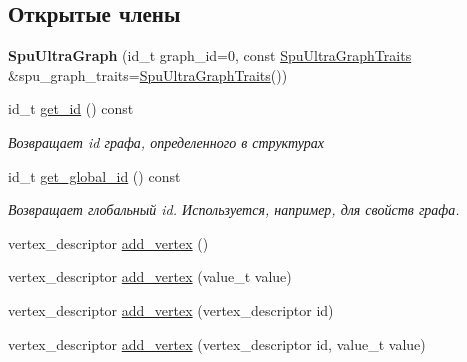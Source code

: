 \subsection*{Открытые члены}
\begin{DoxyCompactItemize}
\item 
\mbox{\label{class_s_p_u___g_r_a_p_h_1_1_spu_ultra_graph_a5092cab48140d2f7ce989555c118e783}} 
{\bfseries Spu\+Ultra\+Graph} (id\+\_\+t graph\+\_\+id=0, const \hyperlink{struct_s_p_u___g_r_a_p_h_1_1_spu_ultra_graph_traits}{Spu\+Ultra\+Graph\+Traits} \&spu\+\_\+graph\+\_\+traits=\hyperlink{struct_s_p_u___g_r_a_p_h_1_1_spu_ultra_graph_traits}{Spu\+Ultra\+Graph\+Traits}())
\item 
\mbox{\label{class_s_p_u___g_r_a_p_h_1_1_spu_ultra_graph_aedf362fe38b37dc25a7b028855718c25}} 
id\+\_\+t \hyperlink{class_s_p_u___g_r_a_p_h_1_1_spu_ultra_graph_aedf362fe38b37dc25a7b028855718c25}{get\+\_\+id} () const
\begin{DoxyCompactList}\small\item\em Возвращает id графа, определенного в структурах \end{DoxyCompactList}\item 
\mbox{\label{class_s_p_u___g_r_a_p_h_1_1_spu_ultra_graph_ad4614b3f8123569a41a872141a1c5594}} 
id\+\_\+t \hyperlink{class_s_p_u___g_r_a_p_h_1_1_spu_ultra_graph_ad4614b3f8123569a41a872141a1c5594}{get\+\_\+global\+\_\+id} () const
\begin{DoxyCompactList}\small\item\em Возвращает глобальный id. Используется, например, для свойств графа. \end{DoxyCompactList}\item 
vertex\+\_\+descriptor \hyperlink{class_s_p_u___g_r_a_p_h_1_1_spu_ultra_graph_a2b2210821bf0f6bce69fe8ec2756b2f7}{add\+\_\+vertex} ()
\item 
vertex\+\_\+descriptor \hyperlink{class_s_p_u___g_r_a_p_h_1_1_spu_ultra_graph_a8c5c1c97abc61017a5e188cd7975e688}{add\+\_\+vertex} (value\+\_\+t value)
\item 
vertex\+\_\+descriptor \hyperlink{class_s_p_u___g_r_a_p_h_1_1_spu_ultra_graph_a0ab2bed50a562ddb4b3a3718cf7a50ab}{add\+\_\+vertex} (vertex\+\_\+descriptor id)
\item 
vertex\+\_\+descriptor \hyperlink{class_s_p_u___g_r_a_p_h_1_1_spu_ultra_graph_a66c63dc4bf4c8a47abd2974f4e16a83c}{add\+\_\+vertex} (vertex\+\_\+descriptor id, value\+\_\+t value)

\end{DoxyCompactItemize}
